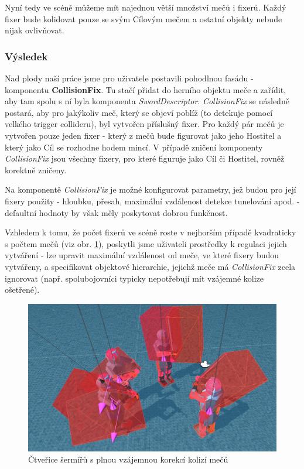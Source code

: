 Nyní tedy ve scéně můžeme mít najednou větší množství mečů i fixerů. Každý fixer bude kolidovat pouze se svým Cílovým mečem a ostatní objekty nebude nijak ovlivňovat.


\subsubsection*{Výsledek}

Nad plody naší práce jsme pro uživatele postavili pohodlnou fasádu - komponentu \textbf{CollisionFix}. Tu stačí přidat do herního objektu meče a zařídit, aby tam spolu s ní byla komponenta \textit{SwordDescriptor}. \textit{CollisionFix} se následně postará, aby pro jakýkoliv meč, který se objeví poblíž (to detekuje pomocí velkého trigger collideru), byl vytvořen příslušný fixer. Pro každý pár mečů je vytvořen pouze jeden fixer - který z mečů bude figurovat jako jeho Hostitel a který jako Cíl se rozhodne hodem mincí. V případě zničení komponenty \textit{CollisionFix} jsou všechny fixery, pro které figuruje jako Cíl či Hostitel, rovněž korektně zničeny.

Na komponentě \textit{CollisionFix} je možné konfigurovat parametry, jež budou pro její fixery použity - hloubku, přesah, maximální vzdálenost detekce tunelování apod. - defaultní hodnoty by však měly poskytovat dobrou funkčnost. 

Vzhledem k tomu, že počet fixerů ve scéně roste v nejhorším případě kvadraticky s počtem mečů (viz obr. \ref{obr05:collisionFixGroup}), poskytli jsme uživateli prostředky k regulaci jejich vytváření - lze upravit maximální vzdálenost od meče, ve které fixery budou vytvářeny, a specifikovat objektové hierarchie, jejichž meče má \textit{CollisionFix} zcela ignorovat (např. spolubojovníci typicky nepotřebují mít vzájemné kolize ošetřené).

\begin{figure}[ht]\centering
  \center
  \includegraphics[width=140mm]{../img/collisionFix-group.png}
  \caption{Čtveřice šermířů s plnou vzájemnou korekcí kolizí mečů}
  \label{obr05:collisionFixGroup}
\end{figure} 



